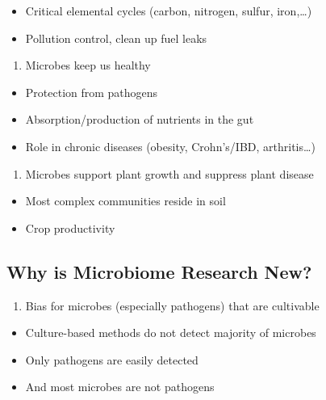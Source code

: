 \documentclass[
]{book}
\providecommand{\tightlist}{%
  \setlength{\itemsep}{0pt}\setlength{\parskip}{0pt}}
\begin{document}
\begin{itemize}
\tightlist
\item
  Critical elemental cycles (carbon, nitrogen, sulfur, iron,\ldots)
\item
  Pollution control, clean up fuel leaks
\end{itemize}

\begin{enumerate}
\def\labelenumi{\arabic{enumi}.}
\setcounter{enumi}{1}
\tightlist
\item
  Microbes keep us healthy
\end{enumerate}

\begin{itemize}
\tightlist
\item
  Protection from pathogens
\item
  Absorption/production of nutrients in the gut
\item
  Role in chronic diseases (obesity, Crohn's/IBD, arthritis\ldots)
\end{itemize}

\begin{enumerate}
\def\labelenumi{\arabic{enumi}.}
\setcounter{enumi}{2}
\tightlist
\item
  Microbes support plant growth and suppress plant disease
\end{enumerate}

\begin{itemize}
\tightlist
\item
  Most complex communities reside in soil
\item
  Crop productivity
\end{itemize}

\hypertarget{why-is-microbiome-research-new}{%
\subsection{Why is Microbiome Research New?}\label{why-is-microbiome-research-new}}

\begin{enumerate}
\def\labelenumi{\arabic{enumi}.}
\tightlist
\item
  Bias for microbes (especially pathogens) that are
  cultivable
\end{enumerate}

\begin{itemize}
\tightlist
\item
  Culture-based methods do not detect majority of microbes
\item
  Only pathogens are easily detected
\item
  And most microbes are not pathogens
\end{itemize}
\end{document}
